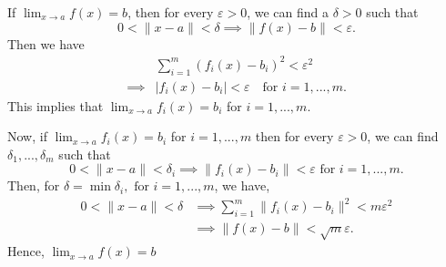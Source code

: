 \begin{solution}
    If $\lim_{x\to a}{f(x)} = b$, then for every
    $\varepsilon>0$, we can find a $\delta>0$ such
    that
    $$0<\|x-a\|<\delta\implies\|f(x)-b\|
    <\varepsilon.$$
    Then we have
    \begin{align*}
        &\sum_{i=1}^{m}{\left(f_i(x)-b_i\right)^2}
    <\varepsilon^2\\
    \implies &\vert f_i(x)-b_i\vert<\varepsilon
    \quad \text{for $i=1,...,m$}.
    \end{align*}
    This implies that $\lim_{x\to a}{f_i(x)}=b_i$ for
    $i=1,...,m$.

    Now, if $\lim_{x\to a}{f_i(x)} =b_i$ for
    $i=1,...,m$ then for every $\varepsilon>0$,
    we can find $\delta_1,...,
    \delta_m$ such that
    $$0<\|x-a\|<\delta_i\implies\|f_i(x)-b_i\|
    <\varepsilon \text{ for } i=1,...,m.$$
    Then, for $\delta =\min{\delta_i},
    \text{ for } i=1,...,m$, we have,
    \begin{align*}
        0<\|x-a\|<\delta &\implies
        \sum_{i=1}^{m}{\|f_i(x)-b_i\|^2}
        <m\varepsilon^2\\
        &\implies \|f(x)-b\|<\sqrt{m}\varepsilon.
    \end{align*}
    Hence, $\lim_{x\to a}{f(x)}=b$
\end{solution}